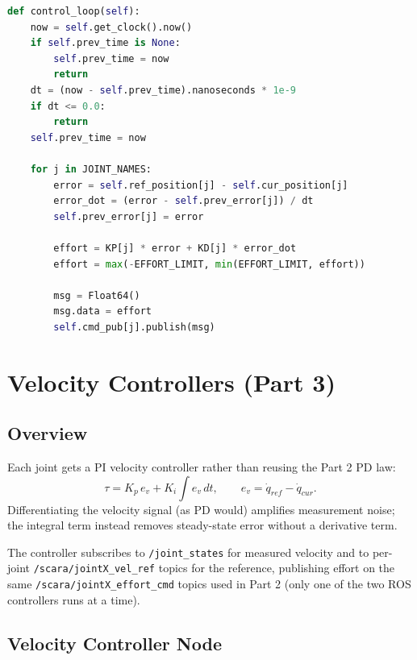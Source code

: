 \documentclass[12pt]{article}
\begin{document}
\begin{lstlisting}[style=ros, language=Python,
    caption={PD control loop, generalized to all three joints}]
def control_loop(self):
    now = self.get_clock().now()
    if self.prev_time is None:
        self.prev_time = now
        return
    dt = (now - self.prev_time).nanoseconds * 1e-9
    if dt <= 0.0:
        return
    self.prev_time = now

    for j in JOINT_NAMES:
        error = self.ref_position[j] - self.cur_position[j]
        error_dot = (error - self.prev_error[j]) / dt
        self.prev_error[j] = error

        effort = KP[j] * error + KD[j] * error_dot
        effort = max(-EFFORT_LIMIT, min(EFFORT_LIMIT, effort))

        msg = Float64()
        msg.data = effort
        self.cmd_pub[j].publish(msg)
\end{lstlisting}

\section{Velocity Controllers (Part 3)}

\subsection{Overview}

Each joint gets a PI velocity controller rather than reusing the Part 2 PD
law:
\[
  \tau = K_p \, e_v + K_i \int e_v \, dt, \qquad e_v = \dot q_{ref} - \dot q_{cur}.
\]
Differentiating the velocity signal (as PD would) amplifies measurement
noise; the integral term instead removes steady-state error without a
derivative term.

The controller subscribes to \texttt{/joint\_states} for measured velocity
and to per-joint \texttt{/scara/jointX\_vel\_ref} topics for the reference,
publishing effort on the same \texttt{/scara/jointX\_effort\_cmd} topics
used in Part 2 (only one of the two ROS controllers runs at a time).

\subsection{Velocity Controller Node}
\end{document}
